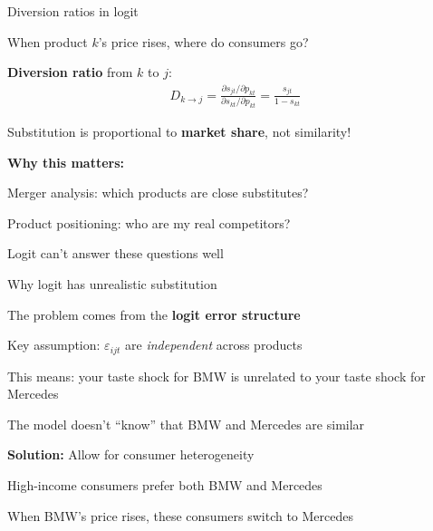 \documentclass[notes,11pt, aspectratio=169]{beamer}
\newenvironment{wideitemize}{\itemize\addtolength{\itemsep}{10pt}}{\enditemize}
\begin{document}
\begin{frame}{Diversion ratios in logit}
	\begin{wideitemize}
		\item When product $k$'s price rises, where do consumers go?
		\item \textbf{Diversion ratio} from $k$ to $j$:
		\begin{align*}
			D_{k \to j} = \frac{\partial s_{jt} / \partial p_{kt}}{\partial s_{kt} / \partial p_{kt}} = \frac{s_{jt}}{1 - s_{kt}}
		\end{align*}
		\item Substitution is proportional to \textbf{market share}, not similarity! \pause
		\item \textbf{Why this matters:}
		\begin{wideitemize}
			\vspace{3pt}
			\item Merger analysis: which products are close substitutes?
			\item Product positioning: who are my real competitors?
			\item Logit can't answer these questions well
		\end{wideitemize}
	\end{wideitemize}
\end{frame}

\begin{frame}{Why logit has unrealistic substitution}
	\begin{wideitemize}
		\item The problem comes from the \textbf{logit error structure}
		\item Key assumption: $\varepsilon_{ijt}$ are \textit{independent} across products
		\item This means: your taste shock for BMW is unrelated to your taste shock for Mercedes
		\item The model doesn't ``know'' that BMW and Mercedes are similar \pause
		\item \textbf{Solution:} Allow for consumer heterogeneity
		\begin{wideitemize}
			\vspace{3pt}
			\item High-income consumers prefer both BMW and Mercedes
			\item When BMW's price rises, these consumers switch to Mercedes
		\end{wideitemize}
	\end{wideitemize}
\end{frame}
\end{document}
